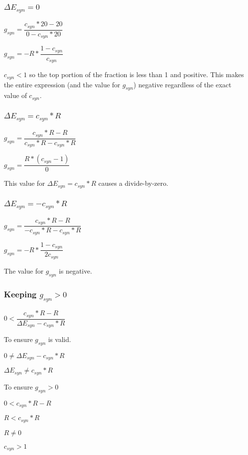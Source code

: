 \documentclass[12pt, letterpaper, oneside, notitlepage, onecolumn]{article}
\begin{document}
\subsubsection{$\Delta E_{syn} = 0$}

$g_{syn} = \dfrac{c_{syn} * 20 - 20}{0 - c_{syn} * 20}$

$g_{syn} = -R * \dfrac{1 - c_{syn}}{c_{syn}}$

$c_{syn} < 1$ so the top portion of the fraction is less than 1 and positive.
This makes the entire expression (and the value for $g_{syn}$) negative
regardless of the exact value of $c_{syn}$.

\subsubsection{$\Delta E_{syn} = c_{syn} * R$}

$g_{syn} = \dfrac{c_{syn} * R - R}{c_{syn} * R - c_{syn} * R}$

$g_{syn} = \dfrac{R * (c_{syn} - 1)}{0}$

This value for $\Delta E_{syn} = c_{syn} * R$ causes a divide-by-zero.

\subsubsection{$\Delta E_{syn} = -c_{syn} * R$}

$g_{syn} = \dfrac{c_{syn} * R - R}{-c_{syn} * R - c_{syn} * R}$

$g_{syn} = -R * \dfrac{1 - c_{syn}}{2 c_{syn}}$

The value for $g_{syn}$ is negative.

\subsubsection{Keeping $g_{syn} > 0$}

$0 < \dfrac{c_{syn} * R - R}{\Delta E_{syn} - c_{syn} * R}$

To ensure $g_{syn}$ is valid.

$0 \neq \Delta E_{syn} - c_{syn} * R$

$\Delta E_{syn} \neq c_{syn} * R$

To ensure $g_{syn} > 0$

$0 < c_{syn} * R - R$

$R < c_{syn} * R$

$R \neq 0$

$c_{syn} > 1$

\end{document}
